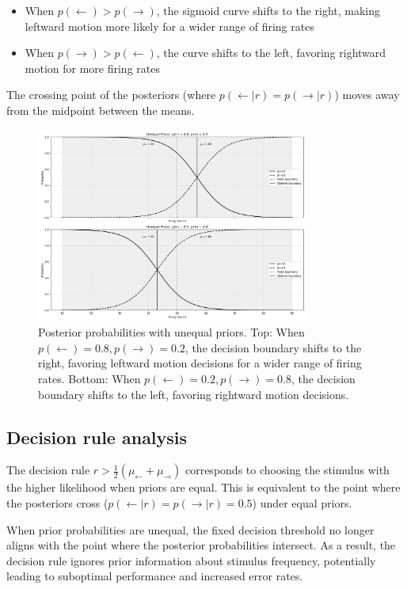 \documentclass{article}
\begin{document}
\begin{itemize}
\item When $p(\leftarrow) > p(\rightarrow)$, the sigmoid curve shifts to the right, making leftward motion more likely for a wider range of firing rates
\item When $p(\rightarrow) > p(\leftarrow)$, the curve shifts to the left, favoring rightward motion for more firing rates
\end{itemize}

The crossing point of the posteriors (where $p(\leftarrow|r) = p(\rightarrow|r)$) moves away from the midpoint between the means.


\begin{figure}[h]
    \centering
    \includegraphics[width=0.8\textwidth]{posterior_unequal_priors.png}
    \caption{Posterior probabilities with unequal priors. 
    Top: When $p(\leftarrow) = 0.8, p(\rightarrow) = 0.2$, the decision boundary shifts to the right, 
    favoring leftward motion decisions for a wider range of firing rates.
    Bottom: When $p(\leftarrow) = 0.2, p(\rightarrow) = 0.8$, the decision boundary shifts to the left,
    favoring rightward motion decisions. 
}
    \label{fig:bayes_unequal_priors}
\end{figure}


\subsection{Decision rule analysis}
The decision rule $r > \frac{1}{2}(\mu_\leftarrow + \mu_\rightarrow)$ corresponds to choosing the stimulus with the higher likelihood when priors are equal. This is equivalent to the point where the posteriors cross ($p(\leftarrow|r) = p(\rightarrow|r) = 0.5$) under equal priors.

When prior probabilities are unequal, the fixed decision threshold no longer aligns with the point where the posterior probabilities intersect. As a result, the decision rule ignores prior information about stimulus frequency, potentially leading to suboptimal performance and increased error rates.
\end{document}
